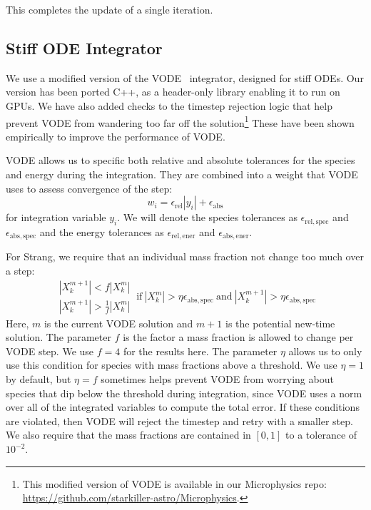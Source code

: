\documentclass[times,preprint]{aastex63}
\newcommand{\atolspec}{{\epsilon_\mathrm{abs,spec}}}
\newcommand{\rtolspec}{{\epsilon_\mathrm{rel,spec}}}
\newcommand{\atolener}{{\epsilon_\mathrm{abs,ener}}}
\newcommand{\rtolener}{{\epsilon_\mathrm{rel,ener}}}
\begin{document}
This completes the update of a single iteration.

\subsection{Stiff ODE Integrator}

We use a modified version of the VODE~\citep{vode} integrator,
designed for stiff ODEs.  Our version has been ported C++, as a
header-only library enabling it to run on GPUs.  We have also added
checks to the timestep rejection logic that help prevent VODE from
wandering too far off the solution\footnote{This modified version of
VODE is available in our Microphysics repo:
\url{https://github.com/starkiller-astro/Microphysics}.}  These have
been shown empirically to improve the performance of VODE.

VODE allows us to specific both relative and absolute tolerances
for the species and energy during the integration.  They are combined
into a weight that VODE uses to assess convergence of the step:
\begin{equation}
w_i = \epsilon_\mathrm{rel} |y_i| + \epsilon_\mathrm{abs}
\end{equation}
for integration variable $y_i$.  We will denote the species tolerances
as $\rtolspec$ and $\atolspec$ and the energy tolerances as $\rtolener$ and
$\atolener$.

For Strang, we require that
an individual mass fraction not change too much over a step:
\begin{equation}
\label{eq:vode_species_reject}
\begin{array}{c}|X_k^{m+1}| < f |X_k^m| \\ |X_k^{m+1}| > \frac{1}{f} |X_k^m| \end{array} ~  \mbox{if}~ |X_k^m| > \eta \atolspec ~\mbox{and}~ |X_k^{m+1}| > \eta \atolspec 
\end{equation}
Here, $m$ is the current VODE solution and $m+1$ is the potential
new-time solution.  The parameter $f$ is the factor a mass fraction is
allowed to change per VODE step.  We use $f = 4$ for the results here.
The parameter $\eta$ allows us to only use this condition for species
with mass fractions above a threshold.  We use $\eta = 1$ by default,
but $\eta = f$ sometimes helps prevent VODE from worrying about
species that dip below the threshold during integration, since VODE
uses a norm over all of the integrated variables to compute the total
error.  If these conditions are violated, then VODE will reject the
timestep and retry with a smaller step.  We also require that the mass
fractions are contained in $[0, 1]$ to a tolerance of $10^{-2}$.
\end{document}
